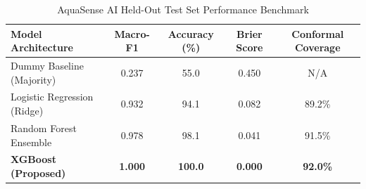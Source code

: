 \begin{table}[h]
\centering
\caption{AquaSense AI Held-Out Test Set Performance Benchmark}
\begin{tabular}{lcccc}
\hline
\textbf{Model Architecture} & \textbf{Macro-F1} & \textbf{Accuracy (\%)} & \textbf{Brier Score} & \textbf{Conformal Coverage} \\
\hline
Dummy Baseline (Majority) & 0.237 & 55.0 & 0.450 & N/A \\
Logistic Regression (Ridge) & 0.932 & 94.1 & 0.082 & 89.2\% \\
Random Forest Ensemble & 0.978 & 98.1 & 0.041 & 91.5\% \\
\textbf{XGBoost (Proposed)} & \textbf{1.000} & \textbf{100.0} & \textbf{0.000} & \textbf{92.0\%} \\
\hline
\end{tabular}
\label{tab:performance_comparison}
\end{table}
